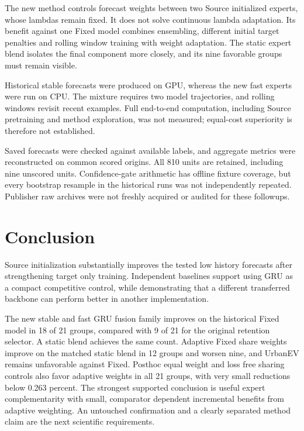 \documentclass[pdflatex,iicol,sn-mathphys-num]{sn-jnl}
\begin{document}
The new method controls forecast weights between two Source initialized experts, whose lambdas remain fixed. It does not solve continuous lambda adaptation. Its benefit against one Fixed model combines ensembling, different initial target penalties and rolling window training with weight adaptation. The static expert blend isolates the final component more closely, and its nine favorable groups must remain visible.

Historical stable forecasts were produced on GPU, whereas the new fast experts were run on CPU. The mixture requires two model trajectories, and rolling windows revisit recent examples. Full end-to-end computation, including Source pretraining and method exploration, was not measured; equal-cost superiority is therefore not established.

Saved forecasts were checked against available labels, and aggregate metrics were reconstructed on common scored origins. All 810 units are retained, including nine unscored units. Confidence-gate arithmetic has offline fixture coverage, but every bootstrap resample in the historical runs was not independently repeated. Publisher raw archives were not freshly acquired or audited for these followups.

\section{Conclusion}

Source initialization substantially improves the tested low history forecasts after strengthening target only training. Independent baselines support using GRU as a compact competitive control, while demonstrating that a different transferred backbone can perform better in another implementation.

The new stable and fast GRU fusion family improves on the historical Fixed model in 18 of 21 groups, compared with 9 of 21 for the original retention selector. A static blend achieves the same count. Adaptive Fixed share weights improve on the matched static blend in 12 groups and worsen nine, and UrbanEV remains unfavorable against Fixed. Posthoc equal weight and loss free sharing controls also favor adaptive weights in all 21 groups, with very small reductions below 0.263 percent. The strongest supported conclusion is useful expert complementarity with small, comparator dependent incremental benefits from adaptive weighting. An untouched confirmation and a clearly separated method claim are the next scientific requirements.
\end{document}
